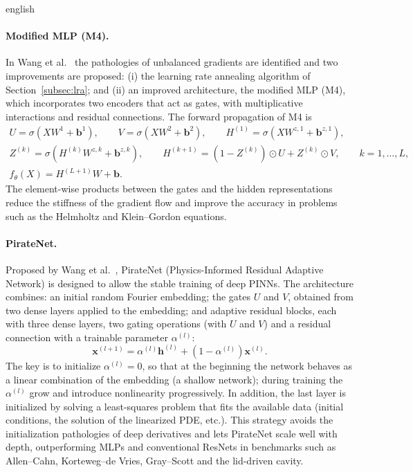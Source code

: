 \documentclass[0000.tex]{subfiles}
\begin{document}
\begin{hyphenrules}{english}
\paragraph{Modified MLP (M4).}
In Wang et al.~\cite{wang2021gradient} the pathologies of unbalanced gradients are identified and two improvements
are proposed: (i) the learning rate annealing algorithm of Section~\ref{subsec:lra}; and (ii) an improved
architecture, the modified MLP (M4), which incorporates two encoders that act as gates, with
multiplicative interactions and residual connections. The forward propagation of M4 is
\begin{equation}
  \begin{gathered}
    U=\sigma(XW^{1}+\mathbf{b}^{1}),\qquad V=\sigma(XW^{2}+\mathbf{b}^{2}),\qquad
    H^{(1)}=\sigma(XW^{z,1}+\mathbf{b}^{z,1}),\\
    Z^{(k)}=\sigma(H^{(k)}W^{z,k}+\mathbf{b}^{z,k}),\qquad
    H^{(k+1)}=(1-Z^{(k)})\odot U+Z^{(k)}\odot V,\qquad k=1,\dots,L,\\
    f_\theta(X)=H^{(L+1)}W+\mathbf{b}.
  \end{gathered}
  \label{eq:m4}
\end{equation}
The element-wise products between the gates and the hidden representations reduce the stiffness of the
gradient flow and improve the accuracy in problems such as the Helmholtz and Klein--Gordon equations.

\paragraph{PirateNet.}
Proposed by Wang et al.~\cite{wang2024piratenets}, PirateNet (Physics-Informed Residual Adaptive Network) is
designed to allow the stable training of deep PINNs. The architecture combines: an initial random Fourier
embedding; the gates $U$ and $V$, obtained from two dense layers applied to the embedding; and adaptive
residual blocks, each with three dense layers, two gating operations (with $U$ and $V$) and a residual
connection with a trainable parameter $\alpha^{(l)}$:
\begin{equation}
  \mathbf{x}^{(l+1)}=\alpha^{(l)}\mathbf{h}^{(l)}+(1-\alpha^{(l)})\mathbf{x}^{(l)}.
  \label{eq:pirate}
\end{equation}
The key is to initialize $\alpha^{(l)}=0$, so that at the beginning the network behaves as a linear
combination of the embedding (a shallow network); during training the $\alpha^{(l)}$ grow and introduce
nonlinearity progressively. In addition, the last layer is initialized by solving a least-squares problem
that fits the available data (initial conditions, the solution of the linearized PDE, etc.). This strategy
avoids the initialization pathologies of deep derivatives and lets PirateNet scale well with depth,
outperforming MLPs and conventional ResNets in benchmarks such as Allen--Cahn, Korteweg--de Vries,
Gray--Scott and the lid-driven cavity.


\end{hyphenrules}
\end{document}
